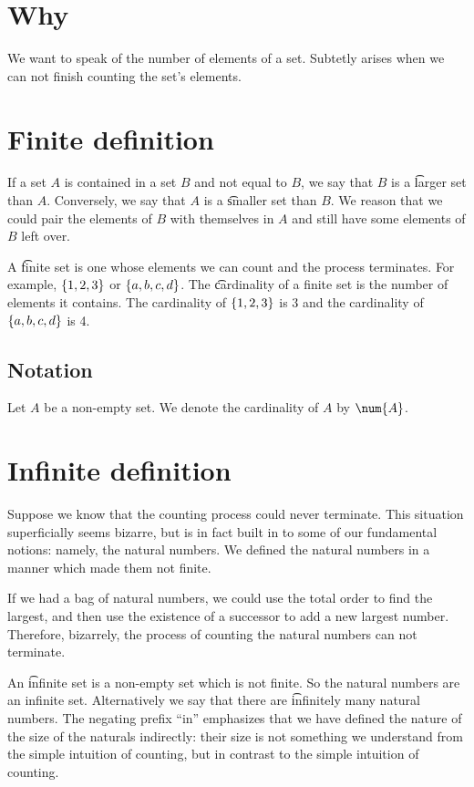 
\section*{Why}

We want to speak of the number of elements of a set.
Subtetly arises when we can not finish counting the set's elements.

\section*{Finite definition}

If a set $A$ is contained in a set $B$ and not equal to $B$,
we say that $B$ is a \t{larger set} than $A$.
Conversely, we say that $A$ is a \t{smaller set} than $B$.
We reason that we could pair the elements of $B$ with themselves
in $A$ and still have some elements of $B$ left over.

A \t{finite set} is one whose elements we can count and the process terminates.
For example, $\{1, 2, 3\}$ or $\{a,b,c,d\}$.
The \t{cardinality} of a finite set is the number of elements it contains.
The cardinality of $\{1, 2, 3\}$ is 3 and the cardinality of $\{a,b,c,d\}$ is 4.

\subsection*{Notation}

Let $A$ be a non-empty set.
We denote the cardinality of $A$ by $\num{A}$.

\section*{Infinite definition}

Suppose we know that the counting process could never terminate.
This situation superficially seems bizarre, but is in fact built in to some of our fundamental notions: namely, the natural numbers.
We defined the natural numbers in a manner which made them not finite.

If we had a bag of natural numbers, we could use the total order
to find the largest, and then use the existence of a successor to
add a new largest number.
Therefore, bizarrely, the process of counting the natural numbers
can not terminate.

An \t{infinite set} is a non-empty set which is not finite.
So the natural numbers are an infinite set.
Alternatively we say that there are \t{infinitely many} natural numbers.
The negating prefix ``in'' emphasizes that we have defined
the nature of the size of the naturals indirectly: their size
is not something we understand from the simple intuition of
counting, but in contrast to the simple intuition of counting.

